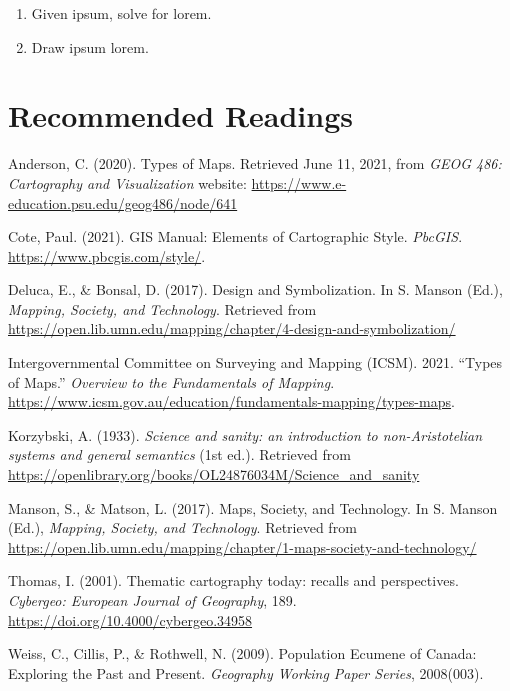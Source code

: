 \documentclass[
]{book}
\providecommand{\tightlist}{%
  \setlength{\itemsep}{0pt}\setlength{\parskip}{0pt}}
\begin{document}
\begin{enumerate}
\def\labelenumi{\arabic{enumi}.}
\setcounter{enumi}{1}
\tightlist
\item
  Given ipsum, solve for lorem.
\item
  Draw ipsum lorem.
\end{enumerate}

\hypertarget{recommended-readings-5}{%
\section*{Recommended Readings}\label{recommended-readings-5}}

Anderson, C. (2020). Types of Maps. Retrieved June 11, 2021, from \emph{GEOG 486: Cartography and Visualization} website: \url{https://www.e-education.psu.edu/geog486/node/641}

Cote, Paul. (2021). GIS Manual: Elements of Cartographic Style. \emph{PbcGIS}. \url{https://www.pbcgis.com/style/}.

Deluca, E., \& Bonsal, D. (2017). Design and Symbolization. In S. Manson (Ed.), \emph{Mapping, Society, and Technology}. Retrieved from \url{https://open.lib.umn.edu/mapping/chapter/4-design-and-symbolization/}

Intergovernmental Committee on Surveying and Mapping (ICSM). 2021. ``Types of Maps.'' \emph{Overview to the Fundamentals of Mapping}. \url{https://www.icsm.gov.au/education/fundamentals-mapping/types-maps}.

Korzybski, A. (1933). \emph{Science and sanity: an introduction to non-Aristotelian systems and general semantics} (1st ed.). Retrieved from \url{https://openlibrary.org/books/OL24876034M/Science_and_sanity}

Manson, S., \& Matson, L. (2017). Maps, Society, and Technology. In S. Manson (Ed.), \emph{Mapping, Society, and Technology}. Retrieved from \url{https://open.lib.umn.edu/mapping/chapter/1-maps-society-and-technology/}

Thomas, I. (2001). Thematic cartography today: recalls and perspectives. \emph{Cybergeo: European Journal of Geography}, 189. \url{https://doi.org/10.4000/cybergeo.34958}

Weiss, C., Cillis, P., \& Rothwell, N. (2009). Population Ecumene of Canada: Exploring the Past and Present. \emph{Geography Working Paper Series}, 2008(003).

  
\end{document}
